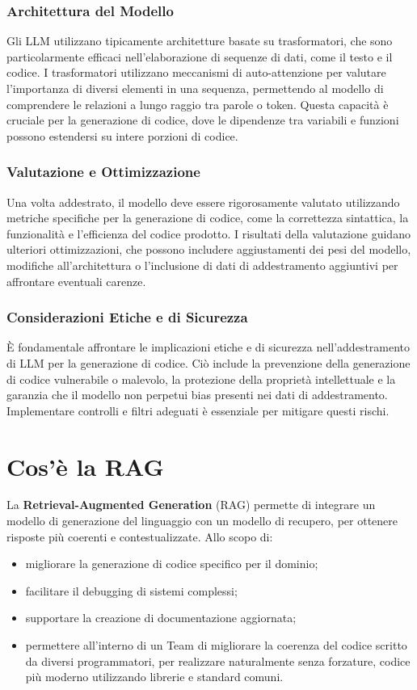 \documentclass[12pt,a4paper,openright,twoside]{book}
\begin{document}
\subsection*{Architettura del Modello}
Gli LLM utilizzano tipicamente architetture basate su trasformatori, che sono particolarmente efficaci nell'elaborazione di sequenze di dati, come il testo e il codice. I trasformatori utilizzano meccanismi di auto-attenzione per valutare l'importanza di diversi elementi in una sequenza, permettendo al modello di comprendere le relazioni a lungo raggio tra parole o token. Questa capacità è cruciale per la generazione di codice, dove le dipendenze tra variabili e funzioni possono estendersi su intere porzioni di codice.

\subsection*{Valutazione e Ottimizzazione}
Una volta addestrato, il modello deve essere rigorosamente valutato utilizzando metriche specifiche per la generazione di codice, come la correttezza sintattica, la funzionalità e l'efficienza del codice prodotto. I risultati della valutazione guidano ulteriori ottimizzazioni, che possono includere aggiustamenti dei pesi del modello, modifiche all'architettura o l'inclusione di dati di addestramento aggiuntivi per affrontare eventuali carenze.

\subsection*{Considerazioni Etiche e di Sicurezza}
È fondamentale affrontare le implicazioni etiche e di sicurezza nell'addestramento di LLM per la generazione di codice. Ciò include la prevenzione della generazione di codice vulnerabile o malevolo, la protezione della proprietà intellettuale e la garanzia che il modello non perpetui bias presenti nei dati di addestramento. Implementare controlli e filtri adeguati è essenziale per mitigare questi rischi.


\chapter{Cos'è la RAG}
La \textbf{Retrieval-Augmented Generation} (RAG) permette di integrare un modello di generazione del linguaggio con un modello di recupero, per ottenere risposte più coerenti e contestualizzate.
Allo scopo di:
\begin{itemize}
    \item migliorare la generazione di codice specifico per il dominio;
    \item facilitare il debugging di sistemi complessi;
    \item supportare la creazione di documentazione aggiornata;
    \item permettere all'interno di un Team di migliorare la coerenza del codice scritto da diversi programmatori, per realizzare naturalmente senza forzature, codice più moderno utilizzando librerie e standard comuni.
\end{itemize}
\end{document}
